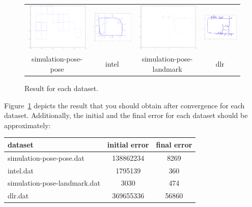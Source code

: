 \documentclass[12pt]{article}
\begin{document}
\begin{figure}
  \centering
  {\scriptsize
  \begin{tabular}{@{}cccc@{}}
    \includegraphics[width=0.22\columnwidth]{sim-pose-pose} &
    \includegraphics[width=0.22\columnwidth]{intel} &
    \includegraphics[width=0.22\columnwidth]{sim-pose-landmark} &
    \includegraphics[width=0.22\columnwidth]{dlr}\\
    simulation-pose-pose & intel & simulation-pose-landmark & dlr
  \end{tabular}}
  \caption{Result for each dataset.}
  \label{fig:result}
\end{figure}

Figure~\ref{fig:result} depicts the result
that you should obtain after convergence for each dataset.
Additionally, the initial and the final error for each dataset should be
approximately:\\[1ex]
\begin{tabular}{|l|c|c|}
  \hline
  dataset & initial error & final error\\\hline\hline
  simulation-pose-pose.dat & 138862234 & 8269\\\hline
  intel.dat & 1795139 & 360\\\hline
  simulation-pose-landmark.dat & 3030 & 474\\\hline
  dlr.dat & 369655336 & 56860\\\hline
\end{tabular}\\
\end{document}
